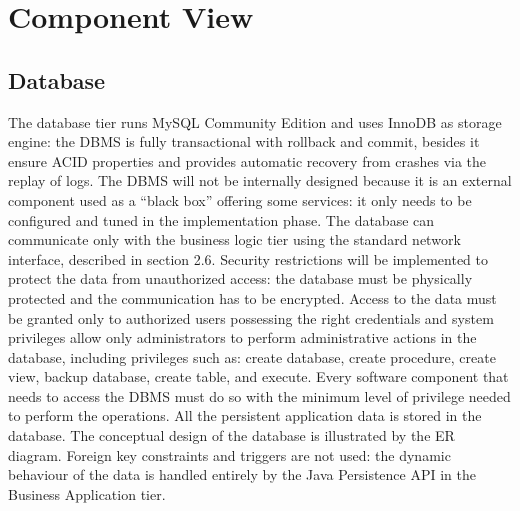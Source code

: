\section{Component View}
\subsection{Database}
The database tier runs MySQL Community Edition and uses InnoDB as storage engine: the DBMS is fully transactional with rollback and commit, besides it ensure ACID properties and provides automatic recovery from crashes via the replay of logs.
The DBMS will not be internally designed because it is an external component used as a “black box” offering some services: it only needs to be configured and tuned in the implementation phase.
The database can communicate only with the business logic tier using the standard network interface, described in section 2.6. 
Security restrictions will be implemented to protect the data from unauthorized access: the database must be physically protected and the communication has to be encrypted.
Access to the data must be granted only to authorized users possessing the right credentials and system privileges allow only administrators to perform administrative actions in the database, including privileges such as: create database, create procedure, create view, backup database, create table, and execute.
Every software component that needs to access the DBMS must do so with the minimum level of privilege needed to perform the operations. All the persistent application data is stored in the database.
The conceptual design of the database is illustrated by the ER diagram.
Foreign key constraints and triggers are not used: the dynamic behaviour of the data is handled entirely by the Java Persistence API in the Business Application tier.



